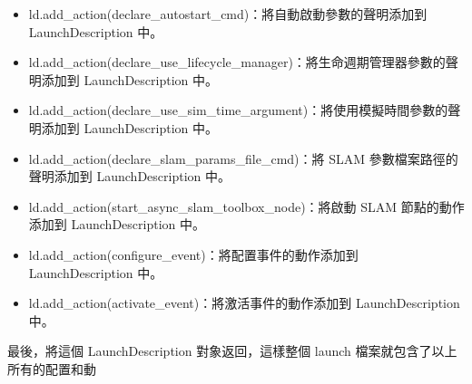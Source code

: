 \begin{itemize}
    \item ld.add\_action(declare\_autostart\_cmd)：將自動啟動參數的聲明添加到 LaunchDescription 中。
    \item ld.add\_action(declare\_use\_lifecycle\_manager)：將生命週期管理器參數的聲明添加到 LaunchDescription 中。
    \item ld.add\_action(declare\_use\_sim\_time\_argument)：將使用模擬時間參數的聲明添加到 LaunchDescription 中。
    \item ld.add\_action(declare\_slam\_params\_file\_cmd)：將 SLAM 參數檔案路徑的聲明添加到 LaunchDescription 中。
    \item ld.add\_action(start\_async\_slam\_toolbox\_node)：將啟動 SLAM 節點的動作添加到 LaunchDescription 中。
    \item ld.add\_action(configure\_event)：將配置事件的動作添加到 LaunchDescription 中。
    \item ld.add\_action(activate\_event)：將激活事件的動作添加到 LaunchDescription 中。
\end{itemize}
最後，將這個 LaunchDescription 對象返回，這樣整個 launch 檔案就包含了以上所有的配置和動
